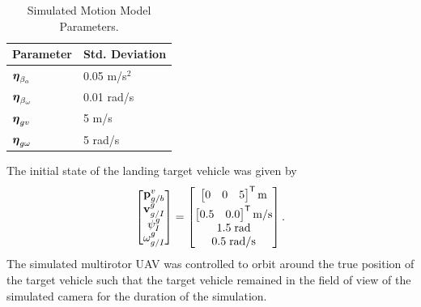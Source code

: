 \begin{table}[htb!]
  \begin{center}
    \caption{Simulated Motion Model Parameters.}
    \label{tab:sim_process_noises}
    \begin{tabular}{l|l}
      \textbf{Parameter} & \textbf{Std. Deviation} \\
      \hline
      $\boldsymbol{\mathrm{\eta}}_{\beta_a}$ & 0.05 m/s$^2$ \\
      $\boldsymbol{\mathrm{\eta}}_{\beta_\omega}$ & 0.01 rad/s \\
      $\boldsymbol{\mathrm{\eta}}_{gv}$ & 5 m/s \\
      $\boldsymbol{\mathrm{\eta}}_{g\omega}$ & 5 rad/s \\
    \end{tabular}
  \end{center}
\end{table}

The initial state of the landing target vehicle was given by
\begin{equation}
  \begin{bmatrix}
    \boldsymbol{\mathrm{p}}_{g/b}^v \\
    \boldsymbol{\mathrm{v}}_{g/I}^g \\
    \psi_I^g \\
    \omega_{g/I}^g
  \end{bmatrix}
  =
  \begin{bmatrix}
    \begin{bmatrix} 0 & 0 & 5 \end{bmatrix}^{\mathsf{T}} \text{m} \\[1mm]
    \begin{bmatrix} 0.5 & 0.0 \end{bmatrix}^{\mathsf{T}} \text{m/s} \\
    1.5 \hphantom{\cdot} \text{rad} \\
    0.5 \hphantom{\cdot} \text{rad/s}
  \end{bmatrix}.
\end{equation}
The simulated multirotor UAV was controlled to orbit around the true position of
the target vehicle such that the target vehicle remained in the field of view of
the simulated camera for the duration of the simulation.

